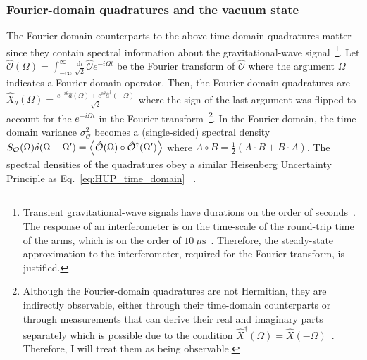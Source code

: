 
\subsubsection{Fourier-domain quadratures and the vacuum state}

The Fourier-domain counterparts to the above time-domain quadratures matter since they contain spectral information about the gravitational-wave signal~\footnote{Transient gravitational-wave signals have durations on the order of seconds~\cite{}. The response of an interferometer is on the time-scale of the round-trip time of the arms, which is on the order of $10~\mu\text{s}$~\cite{}. Therefore, the steady-state approximation to the interferometer, required for the Fourier transform, is justified.}. %
Let $\hat{\mathcal{O}}(\Omega) = \int_{-\infty}^\infty \frac{\mathrm{d}t}{\sqrt{2}} \hat{\mathcal{O}} e^{-i\Omega t}$ be the Fourier transform of $\hat{\mathcal{O}}$ where the argument $\Omega$ indicates a Fourier-domain operator. Then, the Fourier-domain quadratures are $\hat{X}_\theta(\Omega)=\frac{e^{-i \theta}\hat{a}(\Omega)+e^{i \theta}\hat{a}^\dag(-\Omega)}{\sqrt{2}}$ where the sign of the last argument was flipped to account for the $e^{-i\Omega t}$ in the Fourier transform~\footnote{Although the Fourier-domain quadratures are not Hermitian, they are indirectly observable, either through their time-domain counterparts or through measurements that can derive their real and imaginary parts separately which is possible due to the condition $\hat{X}^\dag(\Omega)=\hat{X}(-\Omega)$~\cite{SCHUMAKER1986317}. Therefore, I will treat them as being observable.}.
In the Fourier domain, the time-domain variance $\sigma_\mathcal{O}^2$ becomes a (single-sided) spectral density $S_\mathcal{O}(\Omega)\delta(\Omega-\Omega')=\ev{\hat{\mathcal{O}}(\Omega)\circ\hat{\mathcal{O}}^\dag(\Omega')}$ where $A\circ B=\frac{1}{2}(A\cdot B+B\cdot A)$.
The spectral densities of the quadratures obey a similar Heisenberg Uncertainty Principle as Eq.~\ref{eq:HUP_time_domain}~\cite{} . 
